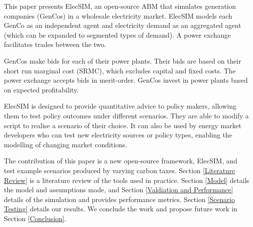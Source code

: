 This paper presents ElecSIM, an open-source ABM that simulates generation companies (GenCos) in a wholesale electricity market. ElecSIM models each GenCo as an independent agent and electricity demand as an aggregated agent (which can be expanded to segmented types of demand). A power exchange facilitates trades between the two. 

GenCos make bids for each of their power plants. Their bids are based on their short run marginal cost (SRMC), which excludes capital and fixed costs. The power exchange accepts bids  in merit-order. GenCos invest in power plants based on expected profitability.	

ElecSIM is designed to provide quantitative advice to policy makers, allowing them to test policy outcomes under different scenarios. They are able to modify a script to realise a scenario of their choice. It can also be used by energy market developers who can test new electricity sources or policy types, enabling the modelling of changing market conditions.







The contribution of this paper is a new open-source framework, ElecSIM, and test example scenarios produced by varying carbon taxes. Section \ref{Literature Review} is a literature review of the tools used in practice. Section \ref{Model} details the model and assumptions made, and Section \ref{Valdiation and Performance} details of the simulation and provides performance metrics. Section \ref{Scenario Testing} details our results. We conclude the work and propose future work in Section \ref{Conclusion}.


